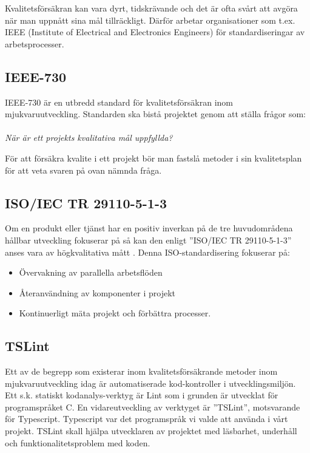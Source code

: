 Kvalitetsförsäkran kan vara dyrt, tidskrävande och det är ofta svårt att avgöra när man uppnått sina mål tillräckligt\cite{lighthouse}.
Därför arbetar organisationer som t.ex. IEEE (Institute of Electrical and Electronics Engineers) för standardiseringar av arbetsprocesser.

\subsection{IEEE-730}

IEEE-730 är en utbredd standard för kvalitetsförsäkran inom mjukvaruutveckling. Standarden ska bistå projektet genom att ställa frågor som:
\\ \\
\emph{När är ett projekts kvalitativa mål uppfyllda?}

För att försäkra kvalite i ett projekt bör man fastslå metoder i sin kvalitetsplan för att veta svaren på ovan nämnda fråga. \\
\clearpage
\subsection{ISO/IEC TR 29110-5-1-3}
Om en produkt eller tjänst har en positiv inverkan på de tre huvudområdena hållbar utveckling fokuserar på så kan den enligt ”ISO/IEC TR 29110-5-1-3” anses vara av högkvalitativa mått \cite{ISOtor}. Denna ISO-standardisering fokuserar på: 

\begin{itemize}
	\item Övervakning av parallella arbetsflöden
	\item Återanvändning av komponenter i projekt
	\item Kontinuerligt mäta projekt och förbättra processer.
\end{itemize}


\subsection{TSLint}
Ett av de begrepp som existerar inom kvalitetsförsäkrande metoder inom mjukvaruutveckling idag är automatiserade kod-kontroller i utvecklingsmiljön.
Ett s.k. statiskt kodanalys-verktyg är Lint som i grunden är utvecklat för programspråket C. En vidareutveckling av verktyget är ”TSLint”, motsvarande för Typescript. Typescript var det programspråk vi valde att använda i vårt projekt. TSLint skall hjälpa utvecklaren av projektet med läsbarhet, underhåll och funktionalitetsproblem med koden.

